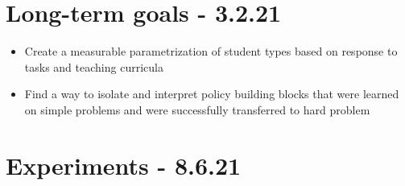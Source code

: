 \documentclass[letterpaper]{article}
\theoremstyle{definition}
\begin{document}
\section{Long-term goals - 3.2.21} \label{sec:long-term}

\begin{itemize}
	\item Create a measurable parametrization of student types based on response to tasks and teaching curricula
	\item Find a way to isolate and interpret policy building blocks that were learned on simple problems and were successfully transferred to hard problem
\end{itemize}

\section{Experiments - 8.6.21} \label{sec:experiment}
\end{document}
